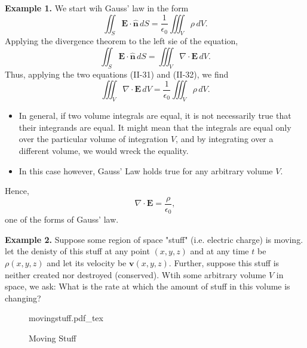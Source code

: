 \documentclass[11pt]{article}
\newcommand{\incfig}[2][1]{%
    \def\svgwidth{#1\columnwidth}
    {#2.pdf_tex}
}
\begin{document}
\textbf{Example 1.} We start wih Gauss' law in the form
\[
	\iint_S \mathbf{E} \cdot \mathbf{\hat{n}} \, dS = \frac{1}{\epsilon_0} \iiint_V \rho \, dV \tag{II-31}
.\]
Applying the divergence theorem to the left sie of the equation,
\[
	\iint_S \mathbf{E} \cdot \mathbf{\hat{n}} \, dS = \iiint_V \nabla \cdot \mathbf{E} \, dV \tag{II-32}
.\]
Thus, applying the two equations (II-31) and (II-32), we find
\[
	\iiint_V \nabla \cdot \mathbf{E} \, dV = \frac{1}{\epsilon_0} \iiint_V \rho \, dV
.\]
\begin{itemize}
	\item In general, if two volume integrals are equal, it is not necessarily true that their integrands are equal. It might mean that the integrals are equal only over the particular volume of integration $V$, and by integrating over a different volume, we would wreck the equality.
	\item In this case however, Gauss' Law holds true for any arbitrary volume $V$.
\end{itemize}

Hence,
\[
	\nabla \cdot \mathbf{E} = \frac{\rho}{\epsilon_0}
,\]
one of the forms of Gauss' law.

\textbf{Example 2.}	Suppose some region of space "stuff" (i.e. electric charge) is moving. let the denisty of this stuff at any point $(x,y,z)$ and at any time $t$ be $\rho(x,y,z)$ and let its velocity be $\mathbf{v}(x,y,z)$. Further, suppose this stuff is neither created nor destroyed (conserved). Wtih some arbitrary volume $V$ in space, we ask: What is the rate at which the amount of stuff in this volume is changing?

\begin{figure}[ht]
    \centering
    \incfig{movingstuff}
    \caption{Moving Stuff}
    \label{fig:movingstuff}
\end{figure}
\end{document}
